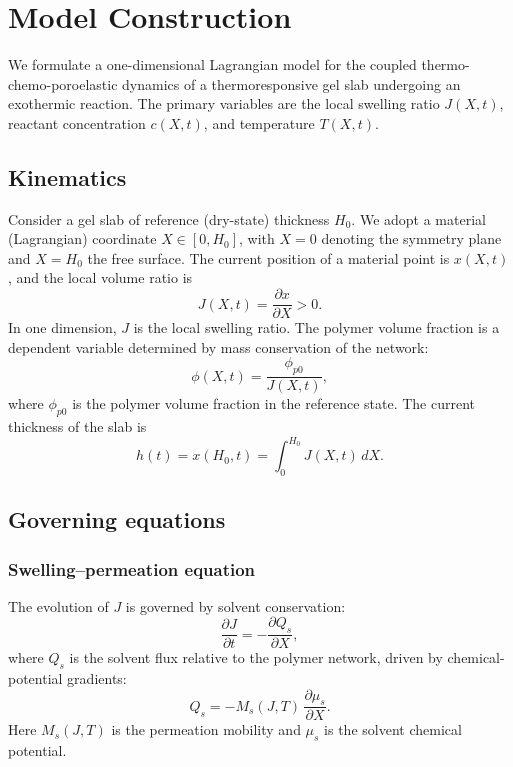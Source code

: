 \documentclass[aps,pre,reprint,superscriptaddress,longbibliography,floatfix]{revtex4-2}
\newcommand{\pp}{\phi_{p0}}
\begin{document}
\section{Model Construction}
\label{app:model}

We formulate a one-dimensional Lagrangian model for the coupled thermo-chemo-poroelastic dynamics of a thermoresponsive gel slab undergoing an exothermic reaction. The primary variables are the local swelling ratio $J(X,t)$, reactant concentration $c(X,t)$, and temperature $T(X,t)$.

\subsection{Kinematics}

Consider a gel slab of reference (dry-state) thickness $H_0$. We adopt a material (Lagrangian) coordinate $X\in[0,H_0]$, with $X=0$ denoting the symmetry plane and $X=H_0$ the free surface. The current position of a material point is $x(X,t)$, and the local volume ratio is
\begin{equation}
  J(X,t) = \frac{\partial x}{\partial X} > 0.
  \label{eq:J_def}
\end{equation}
In one dimension, $J$ is the local swelling ratio. The polymer volume fraction is a dependent variable determined by mass conservation of the network:
\begin{equation}
  \phi(X,t) = \frac{\pp}{J(X,t)},
  \label{eq:phi_J}
\end{equation}
where $\pp$ is the polymer volume fraction in the reference state. The current thickness of the slab is
\begin{equation}
  h(t) = x(H_0,t) = \int_0^{H_0} J(X,t)\,dX.
  \label{eq:thickness}
\end{equation}

\subsection{Governing equations}

\subsubsection{Swelling--permeation equation}

The evolution of $J$ is governed by solvent conservation:
\begin{equation}
  \frac{\partial J}{\partial t} = -\frac{\partial Q_s}{\partial X},
  \label{eq:J_evol}
\end{equation}
where $Q_s$ is the solvent flux relative to the polymer network, driven by chemical-potential gradients:
\begin{equation}
  Q_s = -M_s(J,T)\,\frac{\partial \mu_s}{\partial X}.
  \label{eq:Qs}
\end{equation}
Here $M_s(J,T)$ is the permeation mobility and $\mu_s$ is the solvent chemical potential.
\end{document}
